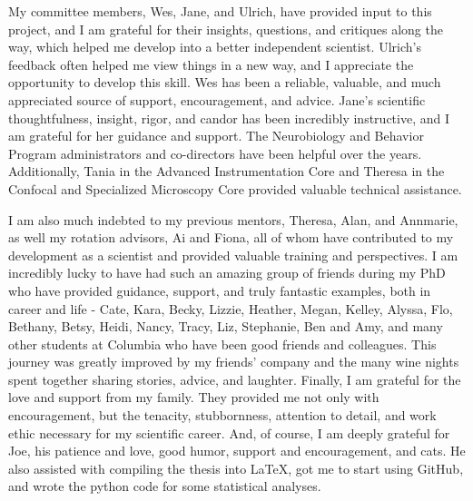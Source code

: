 My committee members, Wes, Jane, and Ulrich, have provided input to this project, and I am grateful for their insights, questions, and critiques along the way, which helped me develop into a better independent scientist.
Ulrich's feedback often helped me view things in a new way, and I appreciate the opportunity to develop this skill. 
Wes has been a reliable, valuable, and much appreciated source of support, encouragement, and advice.
Jane's scientific thoughtfulness, insight, rigor, and candor has been incredibly instructive, and I am grateful for her guidance and support.
The Neurobiology and Behavior Program administrators and co-directors have been helpful over the years.
Additionally, Tania in the Advanced Instrumentation Core and Theresa in the Confocal and Specialized Microscopy Core provided valuable technical assistance.

I am also much indebted to my previous mentors, Theresa, Alan, and Annmarie, as well my rotation advisors, Ai and Fiona, all of whom have contributed to my development as a scientist and provided valuable training and perspectives.
I am incredibly lucky to have had such an amazing group of friends during my PhD who have provided guidance, support, and truly fantastic examples, both in career and life - Cate, Kara, Becky, Lizzie, Heather, Megan, Kelley, Alyssa, Flo, Bethany, Betsy, Heidi, Nancy, Tracy, Liz, Stephanie, Ben and Amy, and many other students at Columbia who have been good friends and colleagues.
This journey was greatly improved by my friends' company and the many wine nights spent together sharing stories, advice, and laughter.
Finally, I am grateful for the love and support from my family.
They provided me not only with encouragement, but the tenacity, stubbornness, attention to detail, and work ethic necessary for my scientific career.
And, of course, I am deeply grateful for Joe, his patience and love, good humor, support and encouragement, and cats.
He also assisted with compiling the thesis into \LaTeX, got me to start using GitHub, and wrote the python code for some statistical analyses.